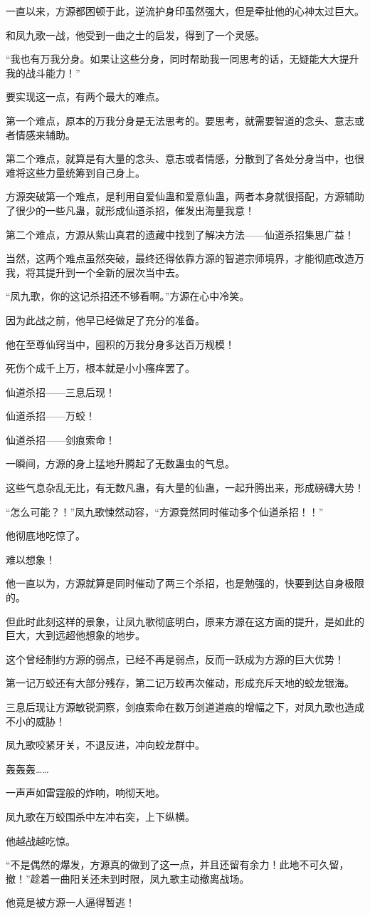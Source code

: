 \begin{this_body}
一直以来，方源都困顿于此，逆流护身印虽然强大，但是牵扯他的心神太过巨大。

和凤九歌一战，他受到一曲之士的启发，得到了一个灵感。

“我也有万我分身。如果让这些分身，同时帮助我一同思考的话，无疑能大大提升我的战斗能力！”

要实现这一点，有两个最大的难点。

第一个难点，原本的万我分身是无法思考的。要思考，就需要智道的念头、意志或者情感来辅助。

第二个难点，就算是有大量的念头、意志或者情感，分散到了各处分身当中，也很难将这些力量统筹到自己身上。

方源突破第一个难点，是利用自爱仙蛊和爱意仙蛊，两者本身就很搭配，方源辅助了很少的一些凡蛊，就形成仙道杀招，催发出海量我意！

第二个难点，方源从紫山真君的遗藏中找到了解决方法——仙道杀招集思广益！

当然，这两个难点虽然突破，最终还得依靠方源的智道宗师境界，才能彻底改造万我，将其提升到一个全新的层次当中去。

“凤九歌，你的这记杀招还不够看啊。”方源在心中冷笑。

因为此战之前，他早已经做足了充分的准备。

他在至尊仙窍当中，囤积的万我分身多达百万规模！

死伤个成千上万，根本就是小小瘙痒罢了。

仙道杀招——三息后现！

仙道杀招——万蛟！

仙道杀招——剑痕索命！

一瞬间，方源的身上猛地升腾起了无数蛊虫的气息。

这些气息杂乱无比，有无数凡蛊，有大量的仙蛊，一起升腾出来，形成磅礴大势！

“怎么可能？！”凤九歌悚然动容，“方源竟然同时催动多个仙道杀招！！”

他彻底地吃惊了。

难以想象！

他一直以为，方源就算是同时催动了两三个杀招，也是勉强的，快要到达自身极限的。

但此时此刻这样的景象，让凤九歌彻底明白，原来方源在这方面的提升，是如此的巨大，大到远超他想象的地步。

这个曾经制约方源的弱点，已经不再是弱点，反而一跃成为方源的巨大优势！

第一记万蛟还有大部分残存，第二记万蛟再次催动，形成充斥天地的蛟龙银海。

三息后现让方源敏锐洞察，剑痕索命在数万剑道道痕的增幅之下，对凤九歌也造成不小的威胁！

凤九歌咬紧牙关，不退反进，冲向蛟龙群中。

轰轰轰……

一声声如雷霆般的炸响，响彻天地。

凤九歌在万蛟围杀中左冲右突，上下纵横。

他越战越吃惊。

“不是偶然的爆发，方源真的做到了这一点，并且还留有余力！此地不可久留，撤！”趁着一曲阳关还未到时限，凤九歌主动撤离战场。

他竟是被方源一人逼得暂逃！

\end{this_body}

